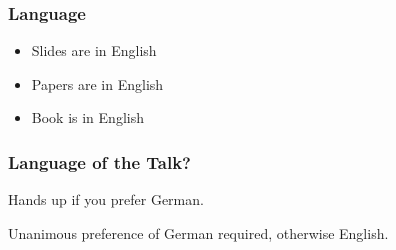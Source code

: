 

\date{2.3.2018}



\renewcommand{\enquote}[1]{\emph{``#1''}} %

\begin{frame}
	\titlepage
	\doclicenseThis
\end{frame}

\begin{frame}
	\frametitle{Language}
	\begin{itemize}
		\item Slides are in English
		\item Papers are in English
		\item Book is in English
	\end{itemize}
\end{frame}

\begin{assignment}
	\frametitle{Language of the Talk?}
	\begin{task}
	Hands up if you prefer German.
	\end{task}
	Unanimous preference of German required, otherwise English.
\end{assignment}

